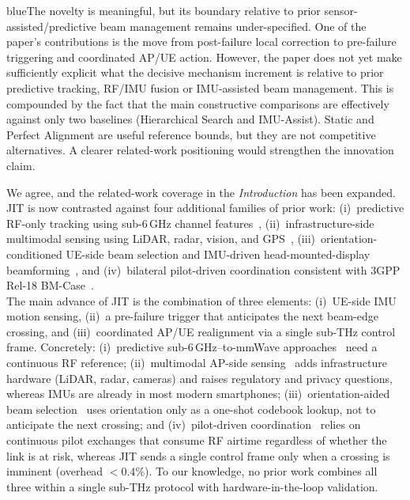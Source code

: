 \documentclass{article}
\newcommand{\blue}[1]{\begin{color}{blue}#1\end{color}}
\begin{document}
\begin{tcbremark}
{\selectfont
\blue{The novelty is meaningful, but its boundary relative to prior sensor-assisted/predictive beam management remains under-specified. One of the paper's contributions is the move from post-failure local correction to pre-failure triggering and coordinated AP/UE action. However, the paper does not yet make sufficiently explicit what the decisive mechanism increment is relative to prior predictive tracking, RF/IMU fusion or IMU-assisted beam management. This is compounded by the fact that the main constructive comparisons are effectively against only two baselines (Hierarchical Search and IMU-Assist). Static and Perfect Alignment are useful reference bounds, but they are not competitive alternatives. A clearer related-work positioning would strengthen the innovation claim.}
}
\end{tcbremark}

\noindent We agree, and the related-work coverage in the \emph{Introduction} has been expanded. JIT is now contrasted against four additional families of prior work: (i)~predictive RF-only tracking using sub-6\,GHz channel features~\cite{Alrabeiah2020DeepLearning}, (ii)~infrastructure-side multimodal sensing using LiDAR, radar, vision, and GPS~\cite{Alkhateeb2023DeepSense, Jiang2023LiDAR, Morais2023Position}, (iii)~orientation-conditioned UE-side beam selection and IMU-driven head-mounted-display beamforming~\cite{Rezaie2022Orientation, Struye2023CoVRage}, and (iv)~bilateral pilot-driven coordination consistent with 3GPP Rel-18 BM-Case~\cite{Alkhateeb2018DLCB, Xue2023Standardization, Heng2021SixChallenges}.\\

\noindent The main advance of JIT is the combination of three elements: (i)~UE-side IMU motion sensing, (ii)~a pre-failure trigger that anticipates the next beam-edge crossing, and (iii)~coordinated AP/UE realignment via a single sub-THz control frame. Concretely: (i)~predictive sub-6\,GHz–to-mmWave approaches~\cite{Alrabeiah2020DeepLearning} need a continuous RF reference; (ii)~multimodal AP-side sensing~\cite{Alkhateeb2023DeepSense, Jiang2023LiDAR, Morais2023Position} adds infrastructure hardware (LiDAR, radar, cameras) and raises regulatory and privacy questions, whereas IMUs are already in most modern smartphones; (iii)~orientation-aided beam selection~\cite{Rezaie2022Orientation, Struye2023CoVRage} uses orientation only as a one-shot codebook lookup, not to anticipate the next crossing; and (iv)~pilot-driven coordination~\cite{Alkhateeb2018DLCB, Xue2023Standardization} relies on continuous pilot exchanges that consume RF airtime regardless of whether the link is at risk, whereas JIT sends a single control frame only when a crossing is imminent (overhead $<0.4\%$). To our knowledge, no prior work combines all three within a single sub-THz protocol with hardware-in-the-loop validation.\\
\end{document}
